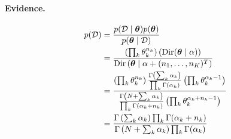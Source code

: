 \paragraph{Evidence.}
    \begin{align*}
        p(\mathcal D)   &= \frac{p(\mathcal D \mid \boldsymbol{\mathbf{\theta}})p(\boldsymbol{\mathbf{\theta}})}{p(\boldsymbol{\mathbf{\theta}} \mid \mathcal D)} \\
                        &= \frac{\left(\prod_k \theta_k^{n_k}\right)\left(\operatorname{Dir}(\boldsymbol{\mathbf{\theta}} \mid \alpha\right))}{\operatorname{Dir}\left(\boldsymbol{\mathbf{\theta}} \mid \alpha + (n_1, \dotsc, n_K)^T\right)} \\
                        &= \frac
                            {
                                \left(\prod_k \theta_k^{n_k}\right)
                                \frac
                                    {\Gamma\left(\sum_k \alpha_k\right)}
                                    {\prod_k \Gamma(\alpha_k)}
                                \left(\prod_k \theta_k^{\alpha_k - 1}\right)
                            }
                            {
                                \frac
                                    {\Gamma\left(N + \sum_k \alpha_k\right)}
                                    {\prod_k \Gamma(\alpha_k + n_k)}
                                \left(\prod_k \theta_k^{\alpha_k + n_k - 1}\right)
                            } \\
                        &= \frac
                            {
                                \Gamma\left(\sum_k \alpha_k\right)
                                \prod_k \Gamma(\alpha_k + n_k)
                            }
                            {
                                \Gamma\left(N + \sum_k \alpha_k\right)
                                \prod_k \Gamma(\alpha_k)
                            }
    \end{align*}